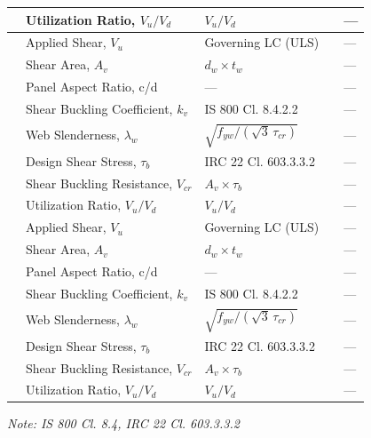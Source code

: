 \documentclass[12pt,a4paper]{report}
\numberwithin{table}{chapter}
\numberwithin{figure}{chapter}
\newcommand{\reportrowpad}{4pt}
\begin{document}
\begin{longtable}{|C{2.5cm}|C{3.5cm}|C{3.5cm}|>{\centering\arraybackslash}p{4.2cm}|C{1.8cm}|}
 & Utilization Ratio, $V_u / V_d$ & $V_u / V_d$ &  & --- \\[\reportrowpad]
\hline
{} & Applied Shear, $V_u$ & Governing LC (ULS) &  & --- \\[\reportrowpad]
 & Shear Area, $A_v$ & $d_w \times t_w$ &  & --- \\[\reportrowpad]
 & Panel Aspect Ratio, c/d & --- &  & --- \\[\reportrowpad]
 & Shear Buckling Coefficient, $k_v$ & IS 800 Cl. 8.4.2.2 &  & --- \\[\reportrowpad]
 & Web Slenderness, $\lambda_w$ & $\sqrt{f_{yw}/(\sqrt{3}\,\tau_{cr})}$ &  & --- \\[\reportrowpad]
 & Design Shear Stress, $\tau_b$ & IRC 22 Cl. 603.3.3.2 &  & --- \\[\reportrowpad]
 & Shear Buckling Resistance, $V_{cr}$ & $A_v \times \tau_b$ &  & --- \\[\reportrowpad]
 & Utilization Ratio, $V_u / V_d$ & $V_u / V_d$ &  & --- \\[\reportrowpad]
\hline
{} & Applied Shear, $V_u$ & Governing LC (ULS) &  & --- \\[\reportrowpad]
 & Shear Area, $A_v$ & $d_w \times t_w$ &  & --- \\[\reportrowpad]
 & Panel Aspect Ratio, c/d & --- &  & --- \\[\reportrowpad]
 & Shear Buckling Coefficient, $k_v$ & IS 800 Cl. 8.4.2.2 &  & --- \\[\reportrowpad]
 & Web Slenderness, $\lambda_w$ & $\sqrt{f_{yw}/(\sqrt{3}\,\tau_{cr})}$ &  & --- \\[\reportrowpad]
 & Design Shear Stress, $\tau_b$ & IRC 22 Cl. 603.3.3.2 &  & --- \\[\reportrowpad]
 & Shear Buckling Resistance, $V_{cr}$ & $A_v \times \tau_b$ &  & --- \\[\reportrowpad]
 & Utilization Ratio, $V_u / V_d$ & $V_u / V_d$ &  & --- \\[\reportrowpad]
\hline
\end{longtable}
\noindent\textit{Note: IS 800 Cl. 8.4, IRC 22 Cl. 603.3.3.2}
\end{document}
